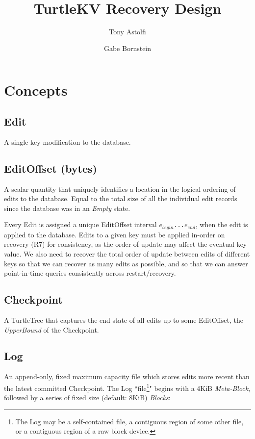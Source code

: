 \documentclass[11pt]{article}
\title{TurtleKV Recovery Design}
\author{
Tony Astolfi
\and
Gabe Bornstein
}
\begin{document}
\maketitle{}

\section{Concepts}\label{section:concepts}

\subsection{Edit}

A single-key modification to the database.

\subsection{EditOffset (bytes)}

A scalar quantity that uniquely identifies a location in the logical
ordering of edits to the database.  Equal to the total size of all the
individual edit records since the database was in an \textit{Empty}
state.

Every Edit is assigned a unique EditOffset interval
\texttt{$e_{begin}$...$e_{end}$}, when the edit is applied to the
database.  Edits to a given key must be applied in-order on recovery
(R7) for consistency, as the order of update may affect the eventual
key value.  We also need to recover the total order of update between
edits of different keys so that we can recover as many edits as
possible, and so that we can answer point-in-time queries consistently
across restart/recovery.

\subsection{Checkpoint}

A TurtleTree that captures the end state of all edits up to some
EditOffset, the \textit{UpperBound} of the Checkpoint.

\subsection{Log}\label{section:concepts:log}

An append-only, fixed maximum capacity file which stores edits more
recent than the latest committed Checkpoint.  The Log
``file\footnote{The Log may be a self-contained file, a contiguous
region of some other file, or a contiguous region of a raw block
device.}" begins with a 4KiB \textit{Meta-Block}, followed by a series
of fixed size (default: 8KiB) \textit{Blocks}:
\end{document}
